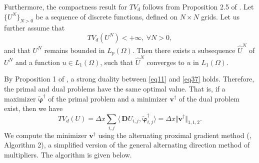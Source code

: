 \documentclass[reqno,a4paper,12pt]{amsart}
\begin{document}
Furthermore, the compactness result for $TV_d$ follows from Proposition 2.5 of \cite{ChambollePock}. Let $\{U^N\}_{N>0}$ be a sequence of discrete functions, defined on $N \times N$ grids.
Let us further assume that
$$ TV_d(U^N) < +\infty, ~\forall N > 0,$$ 
and that $U^N$ remains bounded in $L_p(\Omega)$. 
Then there exists a subsequence $\hat{U}^{N}$ of $U^{N}$  and a function $u \in L_1(\Omega)$, such that $\hat{U}^N$ converges to $u$ in $L_1(\Omega)$.



 



By Proposition 1 of \cite{Condat}, a strong duality between \eqref{eq11} and \eqref{eq37} holds. Therefore, the primal and dual problems have the same optimal value. That is, if a maximizer $\widetilde{\bm{\varphi}}^{\dagger}$ of the primal problem and a minimizer $\bm{v}^{\dagger}$ of the dual problem exist, then we have $$TV_d(U) = \Delta x \sum_{i,j} \langle\, \bm{D}U _{i,j}, \widetilde{\bm{\varphi}}^{\dagger}_{i,j} \rangle  = \Delta x \Vert \bm{v}^{\dagger} \Vert_{1,1,2}.$$ 
We compute the minimizer $\bm{v}^{\dagger}$ using the alternating proximal gradient method (\cite{Condat}, Algorithm 2), a simplified version of the general alternating direction method of multipliers. The  algorithm is given below. \newline
\end{document}
